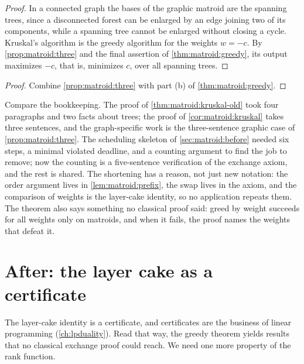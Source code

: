 \begin{refsection}
\begin{proof}
In a connected graph the bases of the graphic matroid are the spanning trees, since a disconnected forest can be enlarged by an edge joining two of its components, while a spanning tree cannot be enlarged without closing a cycle. Kruskal's algorithm is the greedy algorithm for the weights $w=-c$. By \cref{prop:matroid:three} and the final assertion of \cref{thm:matroid:greedy}, its output maximizes $-c$, that is, minimizes $c$, over all spanning trees.
\end{proof}


\begin{proof}
Combine \cref{prop:matroid:three} with part (b) of \cref{thm:matroid:greedy}.
\end{proof}

Compare the bookkeeping. The proof of \cref{thm:matroid:kruskal-old} took four paragraphs and two facts about trees; the proof of \cref{cor:matroid:kruskal} takes three sentences, and the graph-specific work is the three-sentence graphic case of \cref{prop:matroid:three}. The scheduling skeleton of \cref{sec:matroid:before} needed six steps, a minimal violated deadline, and a counting argument to find the job to remove; now the counting is a five-sentence verification of the exchange axiom, and the rest is shared. The shortening has a reason, not just new notation: the order argument lives in \cref{lem:matroid:prefix}, the swap lives in the axiom, and the comparison of weights is the layer-cake identity, so no application repeats them. The theorem also says something no classical proof said: greed by weight succeeds for all weights only on matroids, and when it fails, the proof names the weights that defeat it.

\section{After: the layer cake as a certificate}\label{sec:matroid:after2}

The layer-cake identity is a certificate, and certificates are the business of linear programming (\cref{ch:lpduality}). Read that way, the greedy theorem yields results that no classical exchange proof could reach. We need one more property of the rank function.


\end{refsection}
